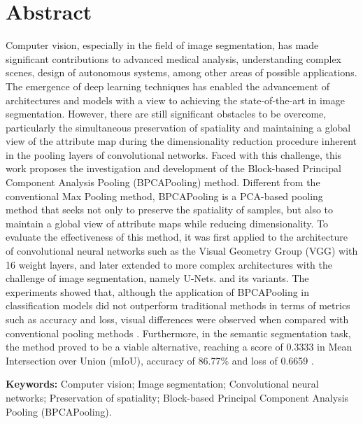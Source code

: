 \section*{Abstract}
\thispagestyle{empty}
Computer vision, especially in the field of image segmentation, has made significant contributions to advanced medical analysis, understanding complex scenes, design of autonomous systems, among other areas of possible applications. The emergence of deep learning techniques has enabled the advancement of architectures and models with a view to achieving the state-of-the-art in image segmentation.
However, there are still significant obstacles to be overcome, particularly the simultaneous preservation of spatiality and maintaining a global view of the attribute map during the dimensionality reduction procedure inherent in the pooling layers of convolutional networks.
Faced with this challenge, this work proposes the investigation and development of the Block-based Principal Component Analysis Pooling (BPCAPooling) method. Different from the conventional Max Pooling method, BPCAPooling is a PCA-based pooling method that seeks not only to preserve the spatiality of samples, but also to maintain a global view of attribute maps while reducing dimensionality.
To evaluate the effectiveness of this method, it was first applied to the architecture of convolutional neural networks such as the Visual Geometry Group (VGG) with 16 weight layers, and later extended to more complex architectures with the challenge of image segmentation, namely U-Nets. and its variants.
The experiments showed that, although the application of BPCAPooling in classification models did not outperform traditional methods in terms of metrics such as accuracy and loss, visual differences were observed when compared with conventional pooling methods . Furthermore, in the semantic segmentation task, the method proved to be a viable alternative, reaching a score of 0.3333 in Mean Intersection over Union (mIoU), accuracy of 86.77\% and loss of 0.6659 .

\textbf{Keywords:} Computer vision; Image segmentation; Convolutional neural networks; Preservation of spatiality; Block-based Principal Component Analysis Pooling (BPCAPooling).